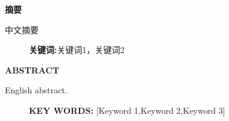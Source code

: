 \begin{center}
    \thispagestyle{empty}
    \fontsize{18pt}{\baselineskip}\bf\textsf{摘\quad 要}
    \vspace{10pt}
    
\end{center}

\vspace{10pt}

中文摘要

\begin{figure}[b]
    \textbf{关键词:}关键词1，关键词2
\end{figure}

\newpage

\begin{center}
    \thispagestyle{empty}
    \fontsize{18pt}{\baselineskip}\sf\textbf{ABSTRACT}
    \vspace{10pt}
    
\end{center}

\vspace{10pt}
\setlength{\parindent}{0em}

English abstract.


\begin{figure}[b]
    \textbf{KEY WORDS:} [Keyword 1,\quad Keyword 2,\quad Keyword 3]
\end{figure}

\setlength{\parindent}{2em}